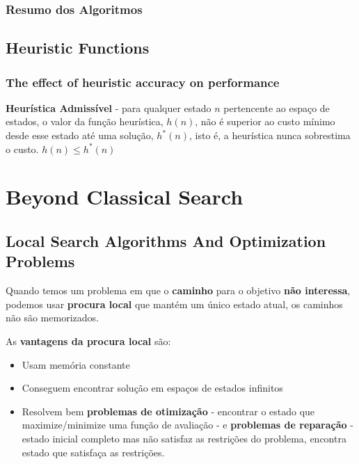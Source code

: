 \documentclass[11pt]{article}
\begin{document}

\subsubsection*{Resumo dos Algoritmos}


\subsection{Heuristic Functions}


\subsubsection{The effect of heuristic accuracy on performance}

\textbf{Heurística Admissível} - para qualquer estado $n$ pertencente ao espaço de estados, o valor da função heurística, $h(n)$, não é superior ao custo mínimo desde esse estado até uma solução, $h^*(n)$, isto é, a heurística nunca sobrestima o custo. $h(n) \leq h^*(n)$

\newpage
\section{Beyond Classical Search}

\subsection{Local Search Algorithms And Optimization Problems}

Quando temos um problema em que o \textbf{caminho} para o objetivo \textbf{não interessa}, podemos usar \textbf{procura local} que mantém um único estado atual, os caminhos não são memorizados.\vspace{4pt}

As \textbf{vantagens da procura local} são:
\begin{itemize}[topsep=2pt,itemsep=0pt]
    \item Usam memória constante
    \item Conseguem encontrar solução em espaços de estados infinitos
    \item Resolvem bem \textbf{problemas de otimização} - encontrar o estado que maximize/minimize uma função de avaliação - e \textbf{problemas de reparação} - estado inicial completo mas não satisfaz as restrições do problema, encontra estado que satisfaça as restrições.
\end{itemize}
\vspace{4pt}
\end{document}
